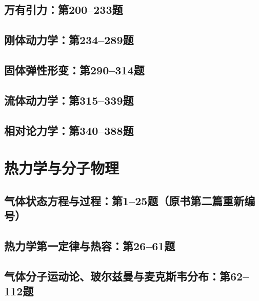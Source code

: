 \documentclass[lang=cn,color=blue,11pt]{elegantbook}
\begin{document}
\section{万有引力：第200--233题}



\section{刚体动力学：第234--289题}






\section{固体弹性形变：第290--314题}




\section{流体动力学：第315--339题}



\section{相对论力学：第340--388题}





\chapter{热力学与分子物理}
\section{气体状态方程与过程：第1--25题（原书第二篇重新编号）}



\section{热力学第一定律与热容：第26--61题}




\section{气体分子运动论、玻尔兹曼与麦克斯韦分布：第62--112题}

\end{document}

